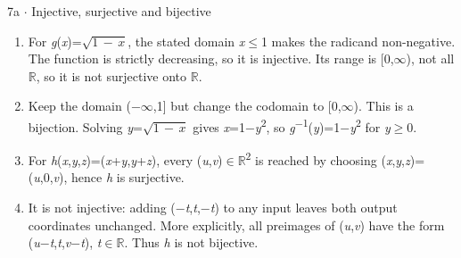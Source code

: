 \documentclass[11pt]{article}
\begin{document}
\begin{keepsection}
\begin{workedbox}{7a \ensuremath{\cdot} Injective, surjective and bijective}
\begin{enumerate}
\begin{equation*}{f}^{-1}({y})\, =\, 2\, +\, \sqrt{{y}\, +\, 1},\, \text{for}\, {y}\, \geq \, -1\end{equation*}
\item For \textit{g}(\textit{x})=\ensuremath{\sqrt{1\, -\, {x}}}, the stated domain \textit{x}\ensuremath{\leq}1 makes the radicand non-negative. The function is strictly decreasing, so it is injective. Its range is [0,\ensuremath{\infty}), not all \ensuremath{\mathbb{R}}, so it is not surjective onto \ensuremath{\mathbb{R}}.
\item Keep the domain (\ensuremath{-}\ensuremath{\infty},1] but change the codomain to [0,\ensuremath{\infty}). This is a bijection. Solving \textit{y}=\ensuremath{\sqrt{1\, -\, {x}}} gives \textit{x}=1\ensuremath{-}\textit{y}\textsuperscript{2}, so \textit{g}\textsuperscript{\ensuremath{-}1}(\textit{y})=1\ensuremath{-}\textit{y}\textsuperscript{2} for \textit{y}\ensuremath{\geq}0.
\item For \textit{h}(\textit{x},\textit{y},\textit{z})=(\textit{x}+\textit{y},\textit{y}+\textit{z}), every (\textit{u},\textit{v})\ensuremath{\in}\ensuremath{\mathbb{R}}\textsuperscript{2} is reached by choosing (\textit{x},\textit{y},\textit{z})=(\textit{u},0,\textit{v}), hence \textit{h} is surjective.
\item It is not injective: adding (\ensuremath{-}\textit{t},\textit{t},\ensuremath{-}\textit{t}) to any input leaves both output coordinates unchanged. More explicitly, all preimages of (\textit{u},\textit{v}) have the form (\textit{u}\ensuremath{-}\textit{t},\textit{t},\textit{v}\ensuremath{-}\textit{t}), \textit{t}\ensuremath{\in}\ensuremath{\mathbb{R}}. Thus \textit{h} is not bijective.
\end{enumerate}
\end{workedbox}

\end{keepsection}
\end{document}
